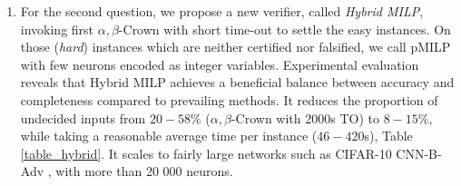 \begin{enumerate}
	
	\item For the second question, we propose a new verifier, called {\em Hybrid MILP}, invoking first 	$\alpha,\beta$-Crown with short time-out to settle the easy instances. On those ({\em hard}) instances which are neither certified nor falsified, we call pMILP with few neurons encoded as integer variables. Experimental evaluation reveals that Hybrid MILP achieves a beneficial balance between accuracy and completeness compared to prevailing methods. It reduces the proportion of undecided inputs from $20-58\%$ ($\alpha,\beta$-Crown with 2000s TO) to $8-15\%$, while taking a reasonable average time per instance ($46-420$s), Table \ref{table_hybrid}. It scales to fairly large networks such as CIFAR-10 CNN-B-Adv \cite{SDPFI}, with more than 20 000 neurons.
\end{enumerate}


